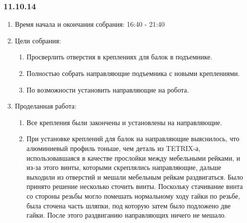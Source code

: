 
\subsubsection{11.10.14}

\begin{enumerate}
	\item Время начала и окончания собрания:
	16:40 - 21:40
	\item Цели собрания:
	\begin{enumerate}
	  \item Просверлить отверстия в креплениях для балок в подъемнике.
	  
	  \item Полностью собрать направляющие подъемника с новыми креплениями.
	  
	  \item По возможности установить направляющие на робота.
	  
    \end{enumerate}
	\item Проделанная работа:
	\begin{enumerate}
	  \item Все крепления были закончены и установлены на направляющие.
      
      \item  При установке креплений для балок на направляющие выяснилось, что алюминиевый профиль тоньше, чем деталь из TETRIX-а, использовавшаяся в качестве прослойки между мебельными рейками, и из-за этого винты, которыми скреплялись направляющие, дальше выходили из отверстий и мешали мебельным рейкам раздвигаться. Было принято решение несколько сточить винты. Поскольку стачивание винта со стороны резьбы могло помешать нормальному ходу гайки по резьбе, была сточена часть шляпки, под которую затем было подложено две гайки. После этого раздвиганию направляющих ничего не мешало.
      

\end{enumerate}
\end{enumerate}
